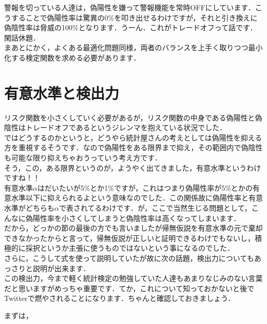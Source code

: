 \documentclass[11pt,a4paper]{ujreport} 	%
\begin{document}
警報を切っている人達は，偽陽性を嫌って警報機能を常時OFFにしています．こうすることで偽陽性率は驚異の0\%を叩き出せるわけですが，それと引き換えに偽陰性率は脅威の100\%となります．うーん．これがトレードオフって話です．\\

閑話休題．\\

まあとにかく，よくある最適化問題同様，両者のバランスを上手く取りつつ最小化する検定関数を求める必要があります．\\

\section{有意水準と検出力\label{sec:test-power}}
リスク関数を小さくしていく必要があるが，リスク関数の中身である偽陽性と偽陰性はトレードオフであるというジレンマを抱えている状況でした．\\

ではどうするのかというと，どうやら統計屋さんの考えとしては偽陽性を抑える方を重視するそうです．なので偽陽性をある限界まで抑え，その範囲内で偽陰性も可能な限り抑えちゃおうっていう考え方です．\\

そう，この，ある限界というのが，ようやく出てきました，有意水準というわけですね！！\\

有意水準$\alpha$はだいたいが5\%とか1\%ですが，これはつまり偽陽性率が5\%とかの有意水準以下に抑えられるよという意味なのでした．この関係故に偽陽性率と有意水準がどちらも$\alpha$で表されてるわけです．が，ここで当然生じる問題として，こんなに偽陽性率を小さくしてしまうと偽陰性率は高くなってしまいます．\\

だから，どっかの節の最後の方でも言いましたが帰無仮説を有意水準の元で棄却できなかったからと言って，帰無仮説が正しいと証明できるわけでもないし，積極的に採択というか主張に使うものではないという事になるのでした．\\

さらに，こうして式を使って説明していたが故に次の話題，検出力についてもあっさりと説明が出来ます．\\

この検出力，今まで軽く統計検定の勉強していた人達もあまりなじみのない言葉だと思いますがめっちゃ重要です．てか，これについて知っておかないと後でTwitterで燃やされることになります．ちゃんと確認しておきましょう．

まずは，
\end{document}
